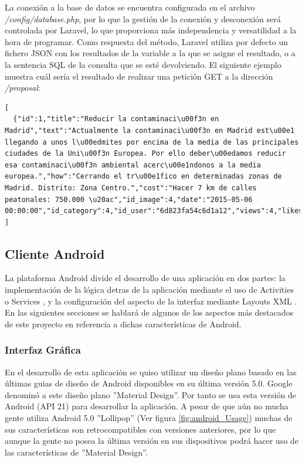 La conexión a la base de datos se encuentra configurada en el archivo \textit{/config/database.php}, por lo que la gestión de la conexión y desconexión será controlada por Laravel, lo que proporciona más independencia y versatilidad a la hora de programar. Como respuesta del método, Laravel utiliza por defecto un fichero JSON con los resultados de la variable a la que se asigne el resultado, o a la sentencia SQL de la consulta que se esté devolviendo. El siguiente ejemplo muestra cuál sería el resultado de realizar una petición GET a la dirección \textit{/proposal}:

\lstset{
  language        = c,    inputencoding=utf8}
\begin{lstlisting}[frame=single]
[
  {"id":1,"title":"Reducir la contaminaci\u00f3n en Madrid","text":"Actualmente la contaminaci\u00f3n en Madrid est\u00e1 llegando a unos l\u00edmites por encima de la media de las principales ciudades de la Uni\u00f3n Europea. Por ello deber\u00edamos reducir esa contaminaci\u00f3n ambiental acerc\u00e1ndonos a la media europea.","how":"Cerrando el tr\u00e1fico en determinadas zonas de Madrid. Distrito: Zona Centro.","cost":"Hacer 7 km de calles peatonales: 750.000 \u20ac","id_image":4,"date":"2015-05-06 00:00:00","id_category":4,"id_user":"6d823fa54c6d1a12","views":4,"likes":3,"not_understood":0,"dislikes":0}
]
\end{lstlisting}

\subsection{Cliente Android}

	La plataforma Android divide el desarrollo de una aplicación en dos partes: la implementación de la lógica detras de la aplicación mediante el uso de Activities \cite{ref:android_activities} o Services \cite{ref:android_service}, y la configuración del aspecto de la interfaz mediante Layouts XML \cite{ref:android_layout}. En las siguientes secciones se hablará de algunos de los aspectos más destacados de este proyecto en referencia a dichas características de Android.

	\subsubsection{Interfaz Gráfica}
	
		En el desarrollo de esta aplicación se quiso utilizar un diseño plano basado en las últimas guias de diseño de Android disponibles en su última versión 5.0. Google denominó a este diseño plano ''Material Design''. Por tanto se usa esta versión de Android (API 21) para desarrollar la aplicación. A pesar de que aún no mucha gente utiliza Android 5.0 ''Lollipop'' (Ver figura \ref{fig:android_Usage}) muchas de sus características son retrocompatibles con versiones anteriores, por lo que aunque la gente no posea la última versión en sus dispositivos podrá hacer uso de las características de ''Material Design''.
	
